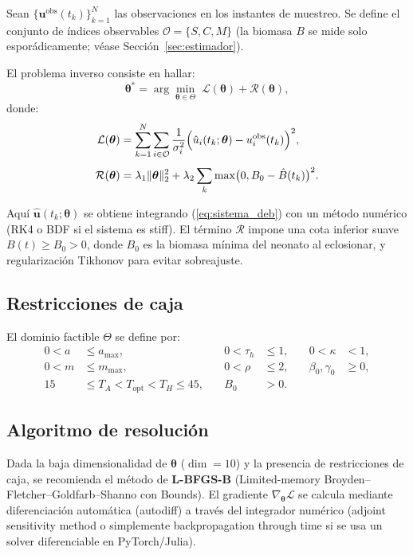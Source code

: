 Sean $\{\mathbf{u}^{\text{obs}}(t_k)\}_{k=1}^{N}$ las observaciones en los instantes de muestreo. Se define el conjunto de índices observables $\mathcal{O} = \{S, C, M\}$ (la biomasa $B$ se mide solo esporádicamente; véase Sección~\ref{sec:estimador}).

El problema inverso consiste en hallar:
\begin{equation}
\label{eq:opt}
\boldsymbol{\theta}^{*} = \arg\min_{\boldsymbol{\theta} \in \Theta} \; \mathcal{L}(\boldsymbol{\theta}) + \mathcal{R}(\boldsymbol{\theta}),
\end{equation}
donde:
\begin{align}
\mathcal{L}(\boldsymbol{\theta}) &= \sum_{k=1}^{N} \sum_{i \in \mathcal{O}} \frac{1}{\sigma_i^2} \Bigl( \hat{u}_i(t_k;\boldsymbol{\theta}) - u_i^{\text{obs}}(t_k) \Bigr)^2, \\[4pt]
\mathcal{R}(\boldsymbol{\theta}) &= \lambda_1 \|\boldsymbol{\theta}\|_2^2 + \lambda_2 \sum_{k} \max\bigl(0, B_0 - \hat{B}(t_k)\bigr)^2.
\end{align}

Aquí $\hat{\mathbf{u}}(t_k;\boldsymbol{\theta})$ se obtiene integrando (\ref{eq:sistema_deb}) con un método numérico (RK4 o BDF si el sistema es stiff). El término $\mathcal{R}$ impone una cota inferior suave $B(t) \geq B_0 > 0$, donde $B_0$ es la biomasa mínima del neonato al eclosionar, y regularización Tikhonov para evitar sobreajuste.

\subsection{Restricciones de caja}

El dominio factible $\Theta$ se define por:
\begin{equation}
\begin{aligned}
0 < a &\leq a_{\max}, &\quad 0 < \tau_h &\leq 1, &\quad 0 < \kappa &< 1, \\
0 < m &\leq m_{\max}, &\quad 0 < \rho &\leq 2, &\quad \beta_0, \gamma_0 &\geq 0, \\
15 &\leq T_A < T_{\text{opt}} < T_H \leq 45, &\quad B_0 &> 0. & &
\end{aligned}
\end{equation}

\subsection{Algoritmo de resolución}

Dada la baja dimensionalidad de $\boldsymbol{\theta}$ ($\dim = 10$) y la presencia de restricciones de caja, se recomienda el método de \textbf{L-BFGS-B} (Limited-memory Broyden--Fletcher--Goldfarb--Shanno con Bounds). El gradiente $\nabla_{\boldsymbol{\theta}} \mathcal{L}$ se calcula mediante diferenciación automática (autodiff) a través del integrador numérico (adjoint sensitivity method o simplemente backpropagation through time si se usa un solver diferenciable en PyTorch/Julia).


